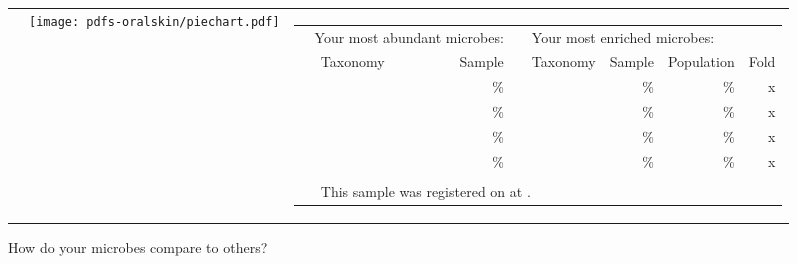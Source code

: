 \documentclass[landscape]{article}
\begin{document}
\begin{tabular*}{\textwidth}{ m{0.3in} m{4.0in} m{7.5in} }
	&
	\vspace{2mm}
	\hspace{-5mm}
	\texttt{[image: pdfs-oralskin/piechart.pdf]}
	
    &
    {\normalsize 
    \vspace{2.5mm}
    \parbox[b][][t]{6.5in}{
	\begin{tabular}{ c l r c l r r r }
    \multicolumn{3}{l}{\large ~~Your most abundant microbes:} & \multicolumn{5}{l}{\large ~~Your most enriched microbes:}\\ \addlinespace[2mm]
        \cline{2-3} \cline{5-8} \addlinespace[1mm]
        & Taxonomy & Sample & & Taxonomy & Sample & Population & Fold \\
        \cline{2-3} \cline{5-8} \addlinespace[1mm]
        & \abundTaxonA{} & \abundSamplA{}\% & & \enrichTaxonA{} & \enrichSamplA{}\% & \enrichPopulA{}\% & \enrichFolddA{}x \\
        & \abundTaxonB{} & \abundSamplB{}\% & & \enrichTaxonB{} & \enrichSamplB{}\% & \enrichPopulB{}\% & \enrichFolddB{}x \\
        & \abundTaxonC{} & \abundSamplC{}\% & & \enrichTaxonC{} & \enrichSamplC{}\% & \enrichPopulC{}\% & \enrichFolddC{}x \\
        & \abundTaxonD{} & \abundSamplD{}\% & & \enrichTaxonD{} & \enrichSamplD{}\% & \enrichPopulD{}\% & \enrichFolddD{}x \\
        \cline{2-3} \cline{5-8} \addlinespace[3mm]
        & \multicolumn{7}{p{5.6in}}{\footnotesize \rareList{}} \\
        & \multicolumn{7}{p{5.6in}}{\footnotesize This sample was registered on \sampledate{} at \sampletime{}.}
	\end{tabular}
	}
	}
\end{tabular*}

\vspace{5mm}


{\huge How do your \sampletype{} microbes compare to others?} 

\vspace{-5mm}
\end{document}
